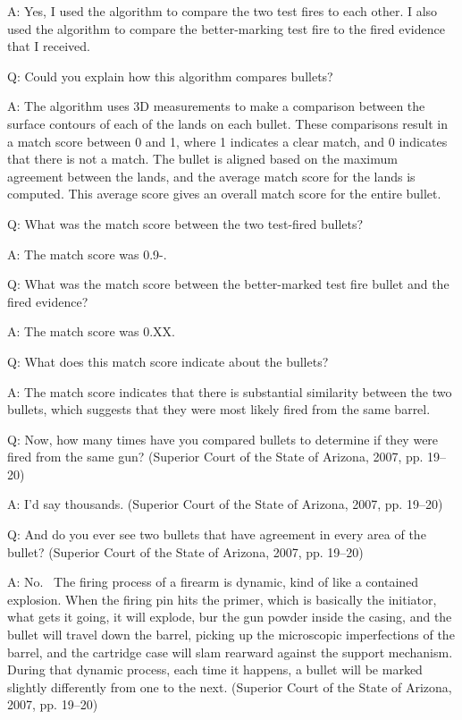 \documentclass[print]{nuthesis}
\begin{document}
A: Yes, I used the algorithm to compare the two test fires to each other.
I also used the algorithm to compare the better-marking test fire to the fired evidence that I received.

Q: Could you explain how this algorithm compares bullets?

A: The algorithm uses 3D measurements to make a comparison between the surface contours of each of the lands on each bullet.
These comparisons result in a match score between 0 and 1, where 1 indicates a clear match, and 0 indicates that there is not a match.
The bullet is aligned based on the maximum agreement between the lands, and the average match score for the lands is computed.
This average score gives an overall match score for the entire bullet.

Q: What was the match score between the two test-fired bullets?

A: The match score was 0.9-.

Q: What was the match score between the better-marked test fire bullet and the fired evidence?

A: The match score was 0.XX.

Q: What does this match score indicate about the bullets?

A: The match score indicates that there is substantial similarity between the two bullets, which suggests that they were most likely fired from the same barrel.

Q: Now, how many times have you compared bullets to determine if they were fired from the same gun? (Superior Court of the State of Arizona, 2007, pp. 19--20)

A: I'd say thousands. (Superior Court of the State of Arizona, 2007, pp. 19--20)

Q: And do you ever see two bullets that have agreement in every area of the bullet? (Superior Court of the State of Arizona, 2007, pp. 19--20)

A: No.~
The firing process of a firearm is dynamic, kind of like a contained explosion.
When the firing pin hits the primer, which is basically the initiator, what gets it going, it will explode, bur the gun powder inside the casing, and the bullet will travel down the barrel, picking up the microscopic imperfections of the barrel, and the cartridge case will slam rearward against the support mechanism.
During that dynamic process, each time it happens, a bullet will be marked slightly differently from one to the next. (Superior Court of the State of Arizona, 2007, pp. 19--20)
\end{document}

